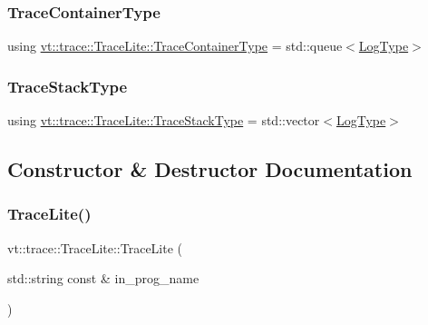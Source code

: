 \subsubsection{\texorpdfstring{Trace\+Container\+Type}{TraceContainerType}}
{\footnotesize\ttfamily using \hyperlink{structvt_1_1trace_1_1_trace_lite_a346a7751a544de425345a8983ed52146}{vt\+::trace\+::\+Trace\+Lite\+::\+Trace\+Container\+Type} =  std\+::queue$<$\hyperlink{structvt_1_1trace_1_1_trace_lite_aeb73e523d31829d3163c877b145afa2a}{Log\+Type}$>$}

\mbox{\label{structvt_1_1trace_1_1_trace_lite_ae827dd1c4f37ac2dbcb6f4898a664b99}} 
\subsubsection{\texorpdfstring{Trace\+Stack\+Type}{TraceStackType}}
{\footnotesize\ttfamily using \hyperlink{structvt_1_1trace_1_1_trace_lite_ae827dd1c4f37ac2dbcb6f4898a664b99}{vt\+::trace\+::\+Trace\+Lite\+::\+Trace\+Stack\+Type} =  std\+::vector$<$\hyperlink{structvt_1_1trace_1_1_trace_lite_aeb73e523d31829d3163c877b145afa2a}{Log\+Type}$>$}



\subsection{Constructor \& Destructor Documentation}
\mbox{\label{structvt_1_1trace_1_1_trace_lite_a328b735cfc479d3bf3339638aeb96a10}} 
\subsubsection{\texorpdfstring{Trace\+Lite()}{TraceLite()}}
{\footnotesize\ttfamily vt\+::trace\+::\+Trace\+Lite\+::\+Trace\+Lite (\begin{DoxyParamCaption}\item[{std\+::string const \&}]{in\+\_\+prog\+\_\+name }\end{DoxyParamCaption})}



